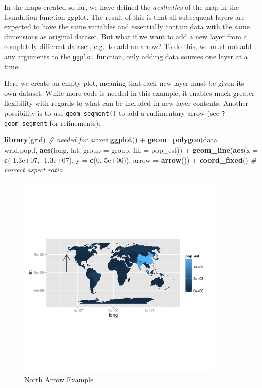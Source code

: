 \documentclass[]{article}
\newenvironment{Shaded}{}{}
\newcommand{\KeywordTok}[1]{\textcolor[rgb]{0.00,0.44,0.13}{\textbf{{#1}}}}
\newcommand{\DataTypeTok}[1]{\textcolor[rgb]{0.56,0.13,0.00}{{#1}}}
\newcommand{\DecValTok}[1]{\textcolor[rgb]{0.25,0.63,0.44}{{#1}}}
\newcommand{\FloatTok}[1]{\textcolor[rgb]{0.25,0.63,0.44}{{#1}}}
\newcommand{\CommentTok}[1]{\textcolor[rgb]{0.38,0.63,0.69}{\textit{{#1}}}}
\newcommand{\NormalTok}[1]{{#1}}
\let\Oldincludegraphics\includegraphics
\renewcommand{\includegraphics}[1]{\Oldincludegraphics[width=10cm]{#1}}
\begin{document}
In the maps created so far, we have defined the \emph{aesthetics} of the
map in the foundation function ggplot. The result of this is that all
subsequent layers are expected to have the same variables and
essentially contain data with the same dimensions as original dataset.
But what if we want to add a new layer from a completely different
dataset, e.g.~to add an arrow? To do this, we must not add any arguments
to the \texttt{ggplot} function, only adding data sources one layer at a
time:

Here we create an empty plot, meaning that each new layer must be given
its own dataset. While more code is needed in this example, it enables
much greater flexibility with regards to what can be included in new
layer contents. Another possibility is to use \texttt{geom\_segment()}
to add a rudimentary arrow (see \texttt{?geom\_segment} for
refinements):

\begin{Shaded}
\begin{Highlighting}[]
\KeywordTok{library}\NormalTok{(grid)  }\CommentTok{# needed for arrow}
\KeywordTok{ggplot}\NormalTok{() + }\KeywordTok{geom_polygon}\NormalTok{(}\DataTypeTok{data =} \NormalTok{wrld.pop.f, }\KeywordTok{aes}\NormalTok{(long, lat, }\DataTypeTok{group =} \NormalTok{group, }\DataTypeTok{fill =} \NormalTok{pop_est)) + }
    \KeywordTok{geom_line}\NormalTok{(}\KeywordTok{aes}\NormalTok{(}\DataTypeTok{x =} \KeywordTok{c}\NormalTok{(-}\FloatTok{1.3e+07}\NormalTok{, -}\FloatTok{1.3e+07}\NormalTok{), }\DataTypeTok{y =} \KeywordTok{c}\NormalTok{(}\DecValTok{0}\NormalTok{, }\FloatTok{5e+06}\NormalTok{)), }\DataTypeTok{arrow =} \KeywordTok{arrow}\NormalTok{()) + }
    \KeywordTok{coord_fixed}\NormalTok{()  }\CommentTok{# correct aspect ratio}
\end{Highlighting}
\end{Shaded}
\begin{figure}[htbp]
\centering
\includegraphics{figure/North_Arrow_Example.png}
\caption{North Arrow Example}
\end{figure}
\end{document}
